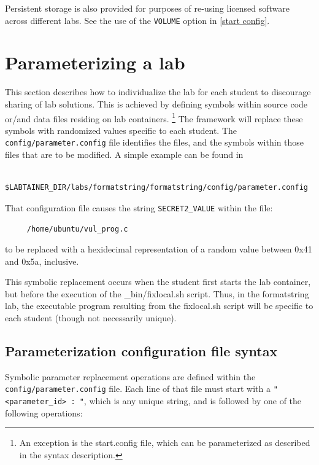 \documentclass[12pt]{article}
\begin{document}
Persistent storage is also provided for purposes of re-using licensed software across different labs.
See the use of the {\tt VOLUME} option in \ref{start config}.

\section{Parameterizing a lab}
\label{parameterize}
This section describes how to individualize the lab for each student to discourage
sharing of lab solutions.  This is achieved by defining symbols within source 
code or/and data files residing on lab containers. \footnote{An exception is the
start.config file, which can be parameterized as described in the syntax description.}  
The framework will replace these symbols with randomized values
specific to each student.  The {\tt config/parameter.config} file identifies the files, and
the symbols within those files that are to be modified.  A simple example can be found in 
\begin{verbatim}
    $LABTAINER_DIR/labs/formatstring/formatstring/config/parameter.config
\end{verbatim}

That configuration file causes the string {\tt SECRET2\_VALUE} within the file:
\begin{verbatim}
     /home/ubuntu/vul_prog.c
\end{verbatim}
to be replaced with a hexidecimal representation of a random value
between 0x41 and 0x5a, inclusive.

This symbolic replacement occurs when the student first starts the lab container,
but before the execution of the \_bin/fixlocal.sh script.  Thus, in the formatstring
lab, the executable program resulting from the fixlocal.sh script will be specific
to each student (though not necessarily unique).

\subsection{Parameterization configuration file syntax}
Symbolic parameter replacement operations are defined within the {\tt config/parameter.config} file.
Each line of that file must start with a \verb!"<parameter_id> : "!, which is any unique string, and
is followed by one of the following operations:
\end{document}
